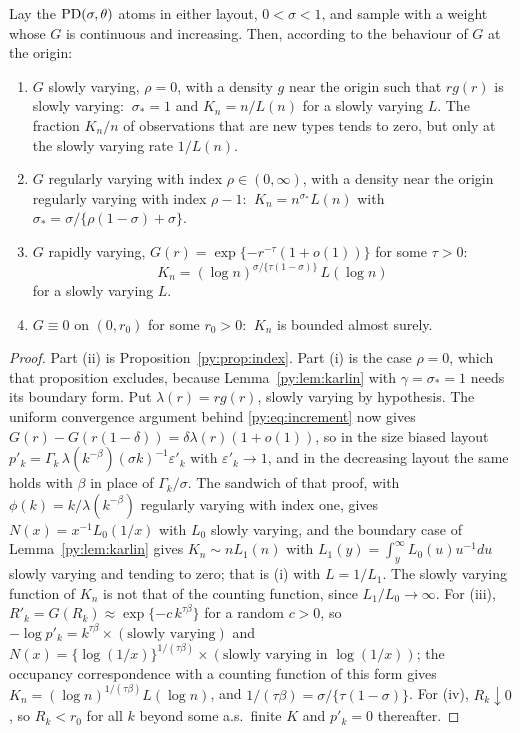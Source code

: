 \begin{theorem}
\label{py:thm:regimes}
Lay the $\mathrm{PD}(\sigma,\theta)$ atoms in either layout, $0 < \sigma < 1$, and sample with a weight whose
$G$ is continuous and increasing. Then, according to the behaviour of $G$ at the origin:
\begin{enumerate}
\item[\emph{(i)}] $G$ slowly varying, $\rho = 0$, with a density $g$ near the origin such that
$rg(r)$ is slowly varying: $\ \sigma_* = 1$ and $K_n = n/L(n)$ for a slowly varying $L$. The fraction $K_n/n$ of observations that are new types tends to zero, but only at the slowly varying rate $1/L(n)$.
\item[\emph{(ii)}] $G$ regularly varying with index $\rho \in (0,\infty)$, with a density near the
origin regularly varying with index $\rho-1$: $\ K_n = n^{\sigma_*}L(n)$ with $\sigma_* = \sigma/\{\rho(1-\sigma)+\sigma\}$.
\item[\emph{(iii)}] $G$ rapidly varying, $G(r) = \exp\{-r^{-\tau}(1+o(1))\}$ for some $\tau > 0$:
\[
K_n = (\log n)^{\sigma/\{\tau(1-\sigma)\}}\,L(\log n)
\]
for a slowly varying $L$.
\item[\emph{(iv)}] $G \equiv 0$ on $(0,r_0)$ for some $r_0 > 0$: $\ K_n$ is bounded almost surely.
\end{enumerate}
\end{theorem}

\begin{proof}
Part (ii) is Proposition~\ref{py:prop:index}. Part (i) is the case $\rho = 0$, which that proposition excludes, because Lemma~\ref{py:lem:karlin} with $\gamma = \sigma_* = 1$ needs its boundary form. Put $\lambda(r) = rg(r)$, slowly varying by hypothesis. The uniform convergence argument behind \eqref{py:eq:increment} now gives $G(r)-G(r(1-\delta)) = \delta\lambda(r)(1+o(1))$, so in the size biased layout $p'_k = \Gamma_k\,\lambda(k^{-\beta})(\sigma k)^{-1}\varepsilon'_k$ with $\varepsilon'_k \to 1$, and in the decreasing layout the same holds with $\beta$ in place of $\Gamma_k/\sigma$. The sandwich of that proof, with $\phi(k) = k/\lambda(k^{-\beta})$ regularly varying with index one, gives $N(x) = x^{-1}L_0(1/x)$ with $L_0$ slowly varying, and the boundary case of Lemma~\ref{py:lem:karlin} gives $K_n \sim nL_1(n)$ with $L_1(y) = \int_y^\infty L_0(u)u^{-1}du$ slowly varying and tending to zero; that is (i) with $L = 1/L_1$. The slowly varying function of $K_n$ is not that of the counting function, since $L_1/L_0 \to \infty$. For (iii), $R'_k = G(R_k) \approx \exp\{-c\,k^{\tau\beta}\}$ for a random
$c > 0$, so $-\log p'_k = k^{\tau\beta}\times(\text{slowly varying})$ and
$N(x) = \{\log(1/x)\}^{1/(\tau\beta)}\times(\text{slowly varying in }\log(1/x))$; the occupancy
correspondence with a counting function of this form gives $K_n = (\log n)^{1/(\tau\beta)}L(\log n)$,
and $1/(\tau\beta) = \sigma/\{\tau(1-\sigma)\}$. For (iv),
$R_k \downarrow 0$, so $R_k < r_0$ for all $k$ beyond some a.s.\ finite $K$ and $p'_k = 0$
thereafter.
\end{proof}

